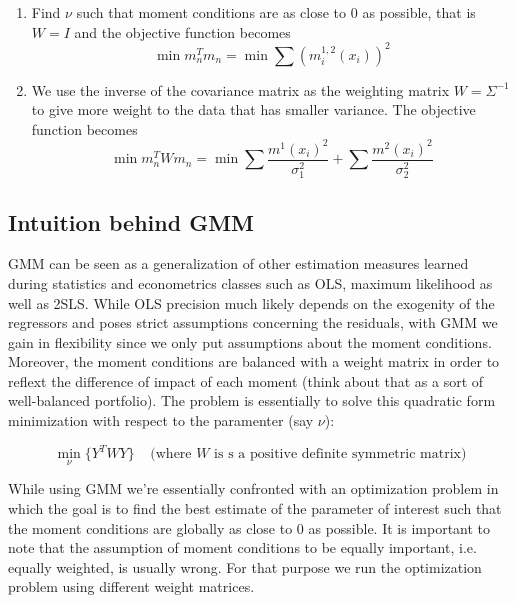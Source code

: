 \begin{enumerate}
\item Find $\nu$ such that moment conditions are as close to 0 as possible, that is $W=I$ and the objective function becomes 
\begin{equation*}
\min m_n^Tm_n = \min \sum \left(m_i^{1,2}(x_i)\right)^2
\end{equation*}
\item We use the inverse of the covariance matrix as the weighting matrix $W=\Sigma^{-1}$ to give more weight to the data that has smaller variance. The objective function becomes 
\begin{equation*}
\min m_n^TWm_n = \min \sum \frac{m^1(x_i)^2}{\sigma_1^2}+ \sum \frac{m^2(x_i)^2}{\sigma_2^2}
\end{equation*}
\end{enumerate}
\subsection*{Intuition behind GMM}
GMM can be seen as a generalization of other estimation measures learned during statistics and econometrics classes such as OLS, maximum likelihood as well as 2SLS. While OLS precision much likely depends on the exogenity of the regressors and poses strict assumptions concerning the residuals, with GMM we gain in flexibility since we only put assumptions about the moment conditions. Moreover, the moment conditions are balanced with a weight matrix in order to reflext the difference of impact of each moment (think about that as a sort of well-balanced portfolio). The problem is essentially to solve this quadratic form minimization with respect to the paramenter (say $\nu$):

\begin{equation*}
    \min_\nu \{Y^T WY\} \;\;\;\;\text{(where $W$ is s a positive definite symmetric matrix)}
\end{equation*}

\noindent 
While using GMM we’re essentially confronted with an optimization problem in which the goal is to find the best estimate of the parameter of interest such that the moment conditions are globally as close to 0 as possible. It is important to note that the assumption of moment conditions to be equally important, i.e. equally weighted, is usually wrong. For that purpose we run the optimization problem using different weight matrices.

